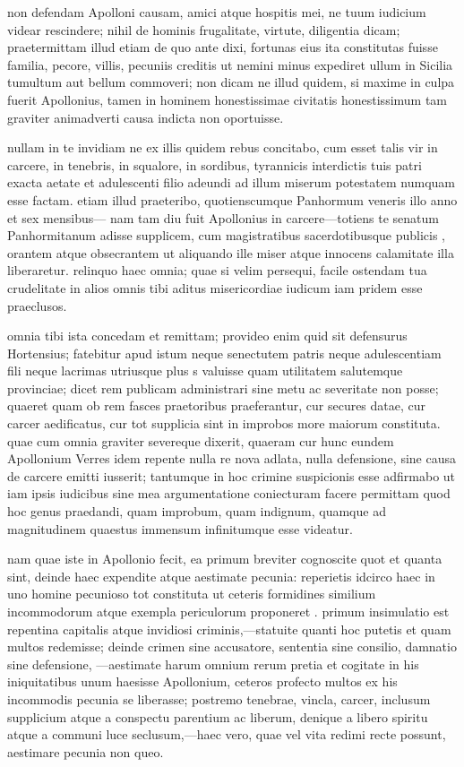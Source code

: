  non defendam Apolloni causam, amici atque hospitis mei, ne tuum iudicium videar rescindere; nihil de hominis frugalitate, virtute, diligentia dicam; praetermittam illud etiam de quo ante dixi, fortunas eius ita constitutas fuisse familia, pecore, villis, pecuniis creditis ut nemini minus expediret ullum in Sicilia tumultum aut bellum commoveri; non dicam ne illud quidem, si maxime in culpa fuerit Apollonius, tamen in hominem honestissimae civitatis honestissimum tam graviter animadverti causa indicta non oportuisse.

 nullam in te invidiam ne ex illis quidem rebus concitabo, cum esset talis vir in carcere, in tenebris, in squalore, in sordibus, tyrannicis interdictis tuis patri exacta aetate et adulescenti filio adeundi ad illum miserum potestatem numquam esse factam. etiam illud praeteribo, quotienscumque Panhormum veneris illo anno et sex mensibus— nam tam diu fuit Apollonius in carcere—totiens te senatum Panhormitanum adisse supplicem, cum magistratibus sacerdotibusque publicis , orantem atque obsecrantem ut aliquando ille miser atque innocens calamitate illa liberaretur. relinquo haec omnia; quae si velim persequi, facile ostendam tua crudelitate in alios omnis tibi aditus misericordiae iudicum iam pridem esse praeclusos.

 omnia tibi ista concedam et remittam; provideo enim quid sit defensurus Hortensius; fatebitur apud istum neque senectutem patris neque adulescentiam fili neque lacrimas utriusque plus s valuisse quam utilitatem salutemque provinciae; dicet rem publicam administrari sine metu ac severitate non posse; quaeret quam ob rem fasces praetoribus praeferantur, cur secures datae, cur carcer aedificatus, cur tot supplicia sint in improbos more maiorum constituta. quae cum omnia graviter severeque dixerit, quaeram cur hunc eundem Apollonium Verres idem repente nulla re nova adlata, nulla defensione, sine causa de carcere emitti iusserit; tantumque in hoc crimine suspicionis esse adfirmabo ut iam ipsis iudicibus sine mea argumentatione coniecturam facere permittam quod hoc genus praedandi, quam improbum, quam indignum, quamque ad magnitudinem quaestus immensum infinitumque esse videatur.

 nam quae iste in Apollonio fecit, ea primum breviter cognoscite quot et quanta sint, deinde haec expendite atque aestimate pecunia: reperietis idcirco haec in uno homine pecunioso tot constituta ut ceteris formidines similium incommodorum atque exempla periculorum proponeret . primum insimulatio est repentina capitalis atque invidiosi criminis,—statuite quanti hoc putetis et quam multos redemisse; deinde crimen sine accusatore, sententia sine consilio, damnatio sine defensione, —aestimate harum omnium rerum pretia et cogitate in his iniquitatibus unum haesisse Apollonium, ceteros profecto multos ex his incommodis pecunia se liberasse; postremo tenebrae, vincla, carcer, inclusum supplicium atque a conspectu parentium ac liberum, denique a libero spiritu atque a communi luce seclusum,—haec vero, quae vel vita redimi recte possunt, aestimare pecunia non queo.

